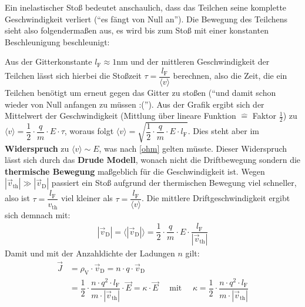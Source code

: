 	        Ein inelastischer Stoß bedeutet anschaulich, dass das Teilchen seine komplette Geschwindigkeit verliert (\enquote{es fängt von Null an}). Die Bewegung des Teilchens sieht also folgendermaßen aus, es wird bis zum Stoß mit einer konstanten Beschleunigung beschleunigt:
	        \begin{center}
		        {}
	        \end{center}
	        Aus der Gitterkonstante \(l_\mathrm{F} \approx 1 \mathrm{nm}\) und der mittleren Geschwindigkeit der Teilchen lässt sich hierbei die Stoßzeit $\tau = \dfrac{l_\mathrm{F}}{\langle { v} \rangle}$ berechnen, also die Zeit, die ein Teilchen benötigt um erneut gegen das Gitter zu stoßen (\enquote{und damit schon wieder von Null anfangen zu müssen :(}). Aus der Grafik ergibt sich der Mittelwert der Geschwindigkeit (Mittlung über lineare Funktion $\hat{=}$ Faktor $\frac{1}{2}$) zu $\langle { v} \rangle = \dfrac{1}{2} \cdot \dfrac{ q}{ m} \cdot E \cdot \tau$, woraus folgt
		        $\langle { v} \rangle =  \sqrt{\dfrac{1}{2} \cdot \dfrac{ q}{ m} \cdot E \cdot l_\mathrm{F}}$. Dies steht aber im \textbf{Widerspruch} zu \(\langle { v} \rangle \sim E \), was nach \ref{ohm} gelten müsste.  Dieser Widerspruch lässt sich durch das \textbf{Drude Modell}, wonach nicht die Driftbewegung sondern die \textbf{thermische Bewegung} maßgeblich für die Geschwindigkeit ist. Wegen \(|\vec{v}_\mathrm{th}| \gg |\vec{v}_\mathrm{D}| \) passiert ein Stoß aufgrund der thermischen Bewegung viel schneller, also ist $\tau  = \dfrac{l_\mathrm{F}}{ v_\mathrm{th}}$ viel kleiner als $\tau  = \dfrac{l_\mathrm{F}}{ \langle v \rangle }$. Die mittlere Driftgeschwindigkeit ergibt sich demnach mit:
	        \begin{equation}\begin{split}
			        |\vec{v}_\mathrm{D}| = \langle {|\vec{v}_\mathrm{D}|} \rangle = \dfrac{1}{2} \cdot \dfrac{ q}{ m} \cdot E \cdot \dfrac{l_\mathrm{F}}{|\vec{v}_\mathrm{th}|}
		        \end{split}\end{equation}
	   Damit und mit der Anzahldichte der Ladungen \(n\) gilt:
	        \begin{equation}\label{ladunggeschw}\begin{split}
			        \vec{J} &= \rho_\text{V} \cdot \vec{v}_\mathrm{D} = n \cdot  q \cdot \vec{v}_\mathrm{D}\\
			        &= \dfrac{1}{2} \cdot \dfrac{n \cdot  q^2 \cdot l_\mathrm{F}}{ m \cdot |\vec{v}_\mathrm{th}|} \cdot \vec{E} = \kappa \cdot \vec{E}\quad \text{ mit }\quad \boxed{\kappa= \dfrac{1}{2} \cdot \dfrac{n \cdot  q^2 \cdot l_\mathrm{F}}{ m \cdot |\vec{v}_\mathrm{th}|}}
		        \end{split}\end{equation}
